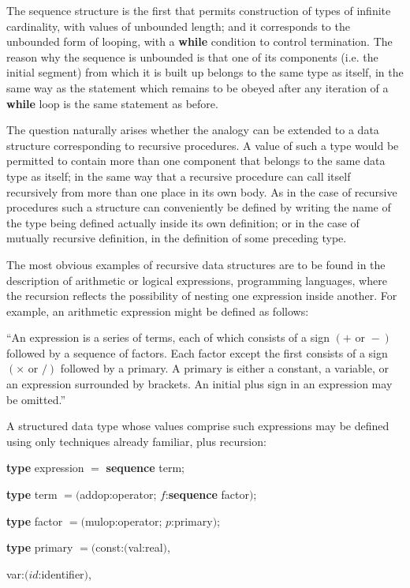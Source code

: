 The sequence structure is the first that permits construction of types of infinite cardinality, with values of unbounded length; and it corresponds to the unbounded form of looping, with a \textbf{while} condition to control termination. The reason why the sequence is unbounded is that one of its components (i.e. the initial segment) from which it is built up belongs to the same type as itself, in the same way as the statement which remains to be obeyed after any iteration of a \textbf{while} loop is the same statement as before.

The question naturally arises whether the analogy can be extended to a data structure corresponding to recursive procedures. A value of such a type would be permitted to contain more than one component that belongs to the same data type as itself; in the same way that a recursive procedure can call itself recursively from more than one place in its own body. As in the case of recursive procedures such a structure can conveniently be defined by writing the name of the type being defined actually inside its own definition; or in the case of mutually recursive definition, in the definition of some preceding type.

The most obvious examples of recursive data structures are to be found in the description of arithmetic or logical expressions, programming languages, where the recursion reflects the possibility of nesting one expression inside another. For example, an arithmetic expression might be defined as follows:

``An expression is a series of terms, each of which consists of a sign $(+ \text{ or } -)$ followed by a sequence of factors. Each factor except the first consists of a sign $(\times \text{ or } /)$ followed by a primary. A primary is either a constant, a variable, or an expression surrounded by brackets. An initial plus sign in an expression may be omitted.''

A structured data type whose values comprise such expressions may be defined using only techniques already familiar, plus recursion:

\quad \textbf{type} expression $=$ \textbf{sequence} term;

\quad \textbf{type} term $= ($addop:operator; $f$:\textbf{sequence} factor$)$;

\quad \textbf{type} factor $= ($mulop:operator; $p$:primary$)$;

\quad \textbf{type} primary $= ($const:$($val:real$)$,

\tabto*{9.3em}var:$(id$:identifier$)$,

